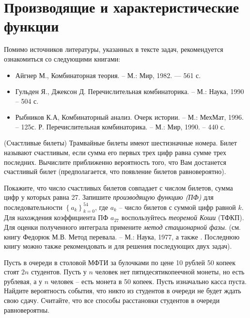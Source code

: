 \section{Производящие и характеристические \\ функции}
\label{genF}

Помимо источников литературы, указанных в тексте задач, рекомендуется ознакомиться со следующими книгами:
\begin{itemize}
 \item Айгнер М., Комбинаторная теория. -- М.: Мир, 1982. — 561 с.
 \item Гульден Я., Джексон Д. Перечислительная комбинаторика. -- М.: Наука, 1990 -- 504 с.
 \item Рыбников К.А, Комбинаторный анализ. Очерк истории. -- М.: МехМат, 1996. -- 125с.
  Р. Перечислительная комбинаторика. --  М.: Мир, 1990. -- 440 с.
\end{itemize}

\begin{problem}(Счастливые билеты)
Трамвайные билеты имеют шестизначные номера. Билет называют счастливым, если 
сумма его первых трех цифр равна сумме трех последних. Вычислите приближенно 
вероятность того, что Вам достанется счастливый билет (предполагается, что 
появление билетов равновероятно).

\end{problem}

\begin{ordre}
Покажите, что число счастливых билетов совпадает с числом билетов, 
сумма цифр у которых равна 27. Запишите \textit{производящую функцию (ПФ)} для 
последовательности $\left\{ {a_k } \right\}_{k=0}^{54} $, где $a_k $ -- число 
билетов с суммой цифр равной $k$. Для нахождения коэффициента ПФ $a_{27} $ 
воспользуйтесь \textit{теоремой Коши} (ТФКП). Для оценки полученного интеграла примените 
\textit{метод стационарной фазы}. (см. книгу Федорюк М.В. Метод перевала. – М.: Наука, 1977, а также \cite{lando}. Последнюю книгу можно также рекомендовать и для решения последующих двух задач).
\end{ordre}

\begin{problem}
\label{sec:katalan}
Пусть в очереди в столовой МФТИ за булочками по цене 10 рублей 50 копеек стоят $2n$ студентов. Пусть у $n$ человек нет пятидесятикопеечной монеты, но есть рублевая, 
а у $n$ человек -- есть монета в 50 копеек. Пусть изначально касса пуста. 
Найдите вероятность события, что никто из студентов в очереди не будет ждать 
свою сдачу. Считайте, что все способы расстановки студентов в очереди равновероятны.
\end{problem}

